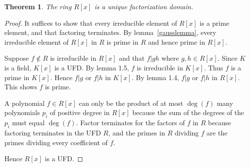 \documentclass{article}
\theoremstyle{norm}
\newtheorem{theorem}{Theorem}[section]
\begin{document}
\begin{theorem}
The ring $R[x]$ is a unique factorization domain.
\end{theorem}
\begin{proof}
It suffices to show that every irreducible element of $R[x]$ is a prime element, and that factoring terminates. By lemma~\ref{gausslemma}, every irreducible element of $R[x]$ in $R$ is prime in $R$ and hence prime in $R[x]$.

Suppose $f\not\in R$ is irreducible in $R[x]$ and that $f|gh$ where $g,h\in R[x]$. Since $K$ is a field, $K[x]$ is a UFD. By lemma 1.5, $f$ is irreducible in $K[x]$. Thus $f$ is a prime in $K[x]$. Hence $f|g$ or $f|h$ in $K[x]$. By lemma 1.4, $f|g$ or $f|h$ in $R[x]$. This shows $f$ is prime.

A polynomial $f\in R[x]$ can only be the product of at most $\deg(f)$ many polynomials $p_i$ of positive degree in $R[x]$ because the sum of the degrees of the $p_i$ must equal $\deg(f)$. Factor terminates for the factors of $f$ in $R$ because factoring terminates in the UFD $R$, and the primes in $R$ dividing $f$ are the primes dividing every coefficient of $f$.

Hence $R[x]$ is a UFD.
\end{proof}
\end{document}
